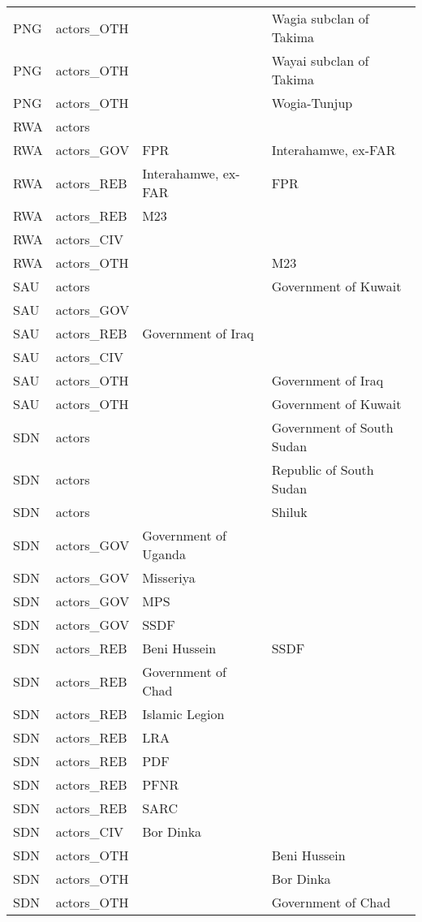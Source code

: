 \begin{table}[ht]
\begin{tabular}{llll}
  PNG & actors\_OTH &  & Wagia subclan of Takima \\ 
  PNG & actors\_OTH &  & Wayai subclan of Takima \\ 
  PNG & actors\_OTH &  & Wogia-Tunjup \\ 
  RWA & actors &  &  \\ 
  RWA & actors\_GOV & FPR & Interahamwe, ex-FAR \\ 
  RWA & actors\_REB & Interahamwe, ex-FAR & FPR \\ 
  RWA & actors\_REB & M23 &  \\ 
  RWA & actors\_CIV &  &  \\ 
  RWA & actors\_OTH &  & M23 \\ 
  SAU & actors &  & Government of Kuwait \\ 
  SAU & actors\_GOV &  &  \\ 
  SAU & actors\_REB & Government of Iraq &  \\ 
  SAU & actors\_CIV &  &  \\ 
  SAU & actors\_OTH &  & Government of Iraq \\ 
  SAU & actors\_OTH &  & Government of Kuwait \\ 
  SDN & actors &  & Government of South Sudan \\ 
  SDN & actors &  & Republic of South Sudan \\ 
  SDN & actors &  & Shiluk \\ 
  SDN & actors\_GOV & Government of Uganda &  \\ 
  SDN & actors\_GOV & Misseriya &  \\ 
  SDN & actors\_GOV & MPS &  \\ 
  SDN & actors\_GOV & SSDF &  \\ 
  SDN & actors\_REB & Beni Hussein & SSDF \\ 
  SDN & actors\_REB & Government of Chad &  \\ 
  SDN & actors\_REB & Islamic Legion &  \\ 
  SDN & actors\_REB & LRA &  \\ 
  SDN & actors\_REB & PDF &  \\ 
  SDN & actors\_REB & PFNR &  \\ 
  SDN & actors\_REB & SARC &  \\ 
  SDN & actors\_CIV & Bor Dinka &  \\ 
  SDN & actors\_OTH &  & Beni Hussein \\ 
  SDN & actors\_OTH &  & Bor Dinka \\ 
  SDN & actors\_OTH &  & Government of Chad \\ 

\end{tabular}
\end{table}
